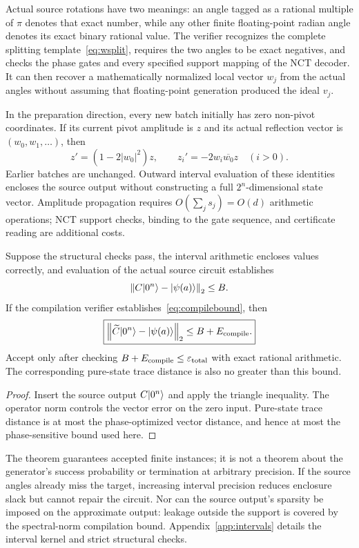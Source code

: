 Actual source rotations have two meanings: an angle tagged as a rational multiple of $\pi$ denotes that exact number, while any other finite floating-point radian angle denotes its exact binary rational value. The verifier recognizes the complete splitting template~\eqref{eq:wsplit}, requires the two angles to be exact negatives, and checks the phase gates and every specified support mapping of the NCT decoder. It can then recover a mathematically normalized local vector $w_j$ from the actual angles without assuming that floating-point generation produced the ideal $v_j$.

In the preparation direction, every new batch initially has zero non-pivot coordinates. If its current pivot amplitude is $z$ and its actual reflection vector is $(w_0,w_1,\ldots)$, then
\begin{equation}\label{eq:sparseprop}
z'=(1-2|w_0|^2)z,\qquad
z_i'=-2w_i\overline{w_0}z\quad(i>0).
\end{equation}
Earlier batches are unchanged. Outward interval evaluation of these identities encloses the source output without constructing a full $2^n$-dimensional state vector. Amplitude propagation requires $O(\sum_js_j)=O(d)$ arithmetic operations; NCT support checks, binding to the gate sequence, and certificate reading are additional costs.

\begin{theorem}\label{thm:certification}
Suppose the structural checks pass, the interval arithmetic encloses values correctly, and evaluation of the actual source circuit establishes
\[
\left\lVert C\lvert 0^n\rangle-\lvert \psi(a)\rangle\right\rVert_2\le B.
\]
If the compilation verifier establishes~\eqref{eq:compilebound}, then
\begin{equation}\label{eq:targetbound}
\boxed{\left\lVert \widetilde C\lvert 0^n\rangle-\lvert \psi(a)\rangle\right\rVert_2\le B+E_{\rm compile}.}
\end{equation}
Accept only after checking $B+E_{\rm compile}\le\varepsilon_{\rm total}$ with exact rational arithmetic. The corresponding pure-state trace distance is also no greater than this bound.
\end{theorem}
\begin{proof}
Insert the source output $C\lvert 0^n\rangle$ and apply the triangle inequality. The operator norm controls the vector error on the zero input. Pure-state trace distance is at most the phase-optimized vector distance, and hence at most the phase-sensitive bound used here.
\end{proof}
The theorem guarantees accepted finite instances; it is not a theorem about the generator's success probability or termination at arbitrary precision. If the source angles already miss the target, increasing interval precision reduces enclosure slack but cannot repair the circuit. Nor can the source output's sparsity be imposed on the approximate output: leakage outside the support is covered by the spectral-norm compilation bound. Appendix~\ref{app:intervals} details the interval kernel and strict structural checks.
